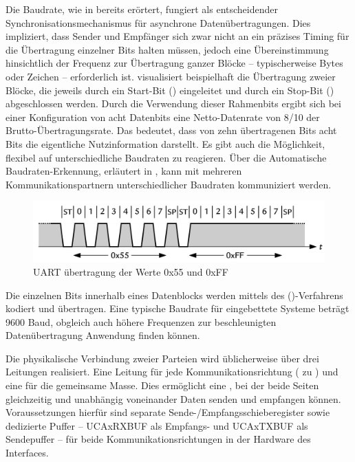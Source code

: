 Die Baudrate, wie in  bereits er\"ortert, fungiert als entscheidender Synchronisationsmechanismus f\"ur asynchrone Daten\"ubertragungen. Dies impliziert, dass Sender und Empf\"anger sich zwar nicht an ein pr\"azises Timing f\"ur die \"Ubertragung einzelner Bits halten m\"ussen, jedoch eine \"Ubereinstimmung hinsichtlich der Frequenz zur \"Ubertragung ganzer Bl\"ocke -- typischerweise Bytes oder Zeichen -- erforderlich ist.  visualisiert beispielhaft die \"Ubertragung zweier Bl\"ocke, die jeweils durch ein Start-Bit () eingeleitet und durch ein Stop-Bit () abgeschlossen werden. Durch die Verwendung dieser Rahmenbits ergibt sich bei einer Konfiguration von acht Datenbits eine Netto-Datenrate von 8/10 der Brutto-\"Ubertragungsrate. Das bedeutet, dass von zehn \"ubertragenen Bits acht Bits die eigentliche Nutzinformation darstellt. Es gibt auch die M\"oglichkeit, flexibel auf unterschiedliche Baudraten zu reagieren. \"Uber die Automatische Baudraten-Erkennung, erl\"autert in , kann mit mehreren Kommunikationspartnern unterschiedlicher Baudraten kommuniziert werden.

\begin{figure}[h!]
	\centering
	\includegraphics[width=1.0\textwidth]{../Bilder/Baudrate.png}
	\caption{UART \"ubertragung der Werte 0x55 und 0xFF\\}
	\label{fig:uart_send}
\end{figure}

Die einzelnen Bits innerhalb eines Datenblocks werden mittels des  ()-Verfahrens kodiert und \"ubertragen. Eine typische Baudrate f\"ur eingebettete Systeme betr\"agt 9600 Baud, obgleich auch h\"ohere Frequenzen zur beschleunigten Daten\"ubertragung Anwendung finden k\"onnen.

Die physikalische Verbindung zweier Parteien wird \"ublicherweise \"uber drei Leitungen realisiert. Eine Leitung f\"ur jede Kommunikationsrichtung ( zu ) und eine f\"ur die gemeinsame Masse. Dies erm\"oglicht eine , bei der beide Seiten gleichzeitig und unabh\"angig voneinander Daten senden und empfangen k\"onnen. Voraussetzungen hierf\"ur sind separate Sende-/Empfangsschieberegister sowie dedizierte Puffer -- UCAxRXBUF als Empfangs- und UCAxTXBUF als Sendepuffer -- f\"ur beide Kommunikationsrichtungen in der Hardware des Interfaces. 


